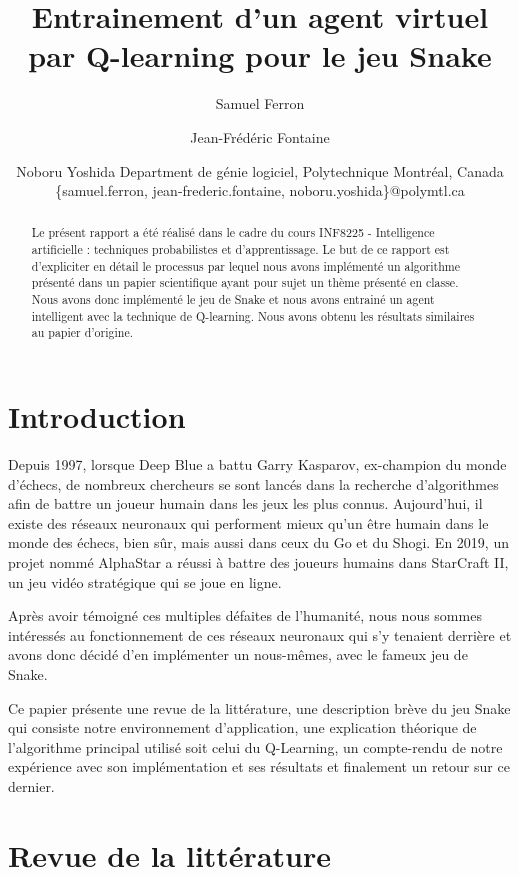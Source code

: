 \documentclass{article}
\title{Entrainement d'un agent virtuel par Q-learning pour le jeu Snake}
\author{
Samuel Ferron\and
Jean-Frédéric Fontaine\and
Noboru Yoshida
\affiliations
Department de génie logiciel, Polytechnique Montréal, Canada\\
\emails
\{samuel.ferron, jean-frederic.fontaine, noboru.yoshida\}@polymtl.ca
}
\begin{document}
\maketitle

\begin{abstract}
Le présent rapport a été réalisé dans le cadre du cours INF8225 - Intelligence artificielle : techniques probabilistes et d’apprentissage. Le but de ce rapport est d'expliciter en détail le processus par lequel nous avons implémenté un algorithme présenté dans un papier scientifique ayant pour sujet un thème présenté en classe. Nous avons donc implémenté le jeu de Snake et nous avons entrainé un agent intelligent avec la technique de Q-learning. Nous avons obtenu les résultats similaires au papier d'origine. 
\end{abstract}

\section{Introduction}

Depuis 1997, lorsque Deep Blue a battu Garry Kasparov, ex-champion du monde d’échecs, de nombreux chercheurs se sont lancés dans la recherche d’algorithmes afin de battre un joueur humain dans les jeux les plus connus. Aujourd’hui, il existe des réseaux neuronaux qui performent mieux qu’un être humain dans le monde des échecs, bien sûr, mais aussi dans ceux du Go et du Shogi. En 2019, un projet nommé AlphaStar a réussi à battre des joueurs humains dans StarCraft II, un jeu vidéo stratégique qui se joue en ligne.\linebreak

Après avoir témoigné ces multiples défaites de l’humanité, nous nous sommes intéressés au fonctionnement de ces réseaux neuronaux qui s’y tenaient derrière et avons donc décidé d’en implémenter un nous-mêmes, avec le fameux jeu de Snake.\linebreak

Ce papier présente une revue de la littérature, une description brève du jeu Snake qui consiste notre environnement d'application, une explication théorique de l'algorithme principal utilisé soit celui du Q-Learning, un compte-rendu de notre expérience avec son implémentation et ses résultats et finalement un retour sur ce dernier.

\section{Revue de la littérature}
 
\end{document}
